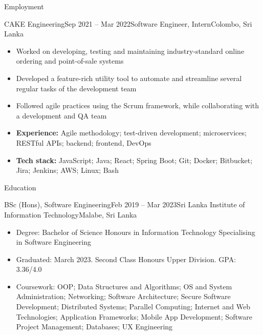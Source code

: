 \documentclass[garamond, a4paper]{modest-cv}
\begin{document}
	\makeheader

	\begin{cvsection}{Employment}
		\begin{cvsubsection}[2]{CAKE Engineering}{Sep 2021 -- Mar 2022}{Software Engineer, Intern}{Colombo, Sri Lanka}
			\begin{itemize}
				\item Worked on developing, testing and maintaining industry-standard online ordering and point-of-sale systems
				\item Developed a feature-rich utility tool to automate and streamline several regular tasks of the development team
				\item Followed agile practices using the Scrum framework, while collaborating with a development and QA team
				\item \textbf{Experience:} Agile methodology; test-driven development; microservices; RESTful APIs; backend; frontend, DevOps
				\item \textbf{Tech stack:} JavaScript; Java; React; Spring Boot; Git; Docker; Bitbucket; Jira; Jenkins; AWS; Linux; Bash
			\end{itemize}
		\end{cvsubsection}
	\end{cvsection}

	\begin{cvsection}{Education}
		\begin{cvsubsection}[2]{BSc (Hons), Software Engineering}{Feb 2019 -- Mar 2023}{Sri Lanka Institute of Information Technology}{Malabe, Sri Lanka}
			\begin{itemize}
				\item Degree: Bachelor of Science Honours in Information Technology Specialising in Software Engineering
				\item Graduated: March 2023. Second Class Honours Upper Division. GPA: 3.36/4.0
				\item Coursework: OOP; Data Structures and Algorithms; OS and System Administration; Networking; Software Architecture; Secure Software Development; Distributed Systems; Parallel Computing; Internet and Web Technologies; Application Frameworks; Mobile App Development; Software Project Management; Databases; UX Engineering
			\end{itemize}
		\end{cvsubsection}
	\end{cvsection}
\end{document}
